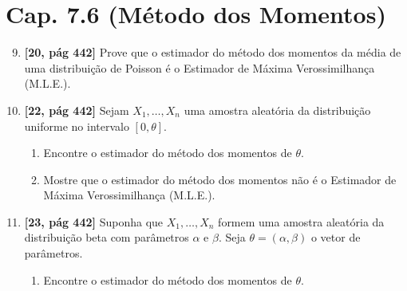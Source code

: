 \documentclass[leqno, 12pt]{article}
\begin{document}
\section*{Cap. 7.6 (Método dos Momentos)}

\begin{enumerate}

\setcounter{enumi}{8}


\item \textbf{[20, pág 442]} Prove que o estimador do método dos momentos da média de uma distribuição de Poisson é o Estimador de Máxima Verossimilhança (M.L.E.).


\item \textbf{[22, pág 442]} Sejam \(X_1, \ldots , X_n\) uma amostra aleatória da distribuição uniforme no intervalo \([0, \theta]\).

\begin{enumerate}
    \item Encontre o estimador do método dos momentos de \( \theta \).

    \item Mostre que o estimador do método dos momentos não é o Estimador de Máxima Verossimilhança (M.L.E.).
\end{enumerate}


\item \textbf{[23, pág 442]} Suponha que \(X_1, \ldots , X_n\) formem uma amostra aleatória da distribuição beta com parâmetros \( \alpha \) e \( \beta \). Seja \( \theta = (\alpha, \beta) \) o vetor de parâmetros.

\begin{enumerate}
    \item Encontre o estimador do método dos momentos de \( \theta \).
\end{enumerate}

\end{enumerate}

\newpage
\nocite{*}


\end{document}
